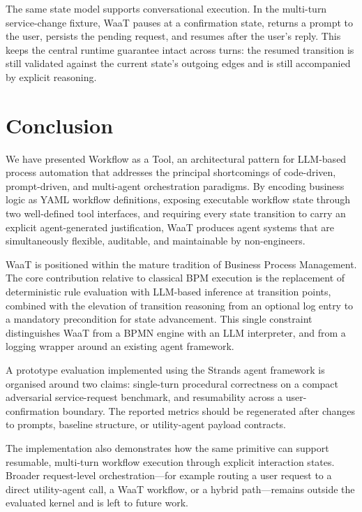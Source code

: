 \documentclass[10pt,conference]{IEEEtran}
\begin{document}
The same state model supports conversational execution.  In the
multi-turn service-change fixture, WaaT pauses at a confirmation
state, returns a prompt to the user, persists the pending request,
and resumes after the user's reply.  This keeps the central
runtime guarantee intact across turns: the resumed transition is
still validated against the current state's outgoing edges and is
still accompanied by explicit reasoning.


\section{Conclusion}
\label{sec:conclusion}

We have presented Workflow as a Tool, an architectural pattern for
LLM-based process automation that addresses the principal
shortcomings of code-driven, prompt-driven, and multi-agent
orchestration paradigms.  By encoding business logic as YAML
workflow definitions, exposing executable workflow state through
two well-defined tool interfaces, and requiring every state
transition to carry an explicit agent-generated justification,
WaaT produces agent systems that are simultaneously flexible,
auditable, and maintainable by non-engineers.

WaaT is positioned within the mature tradition of Business Process
Management.  The core contribution relative to classical BPM
execution is the replacement of deterministic rule evaluation with
LLM-based inference at transition points, combined with the
elevation of transition reasoning from an optional log entry to a
mandatory precondition for state advancement.  This single
constraint distinguishes WaaT from a BPMN engine with an LLM
interpreter, and from a logging wrapper around an existing agent
framework.

A prototype evaluation implemented using the Strands agent
framework is organised around two claims: single-turn procedural
correctness on a compact adversarial service-request benchmark,
and resumability across a user-confirmation boundary.  The reported
metrics should be regenerated after changes to prompts, baseline
structure, or utility-agent payload contracts.

The implementation also demonstrates how the same primitive can
support resumable, multi-turn workflow execution through explicit
interaction states.  Broader request-level orchestration---for
example routing a user request to a direct utility-agent call,
a WaaT workflow, or a hybrid path---remains outside the evaluated
kernel and is left to future work.
\end{document}

